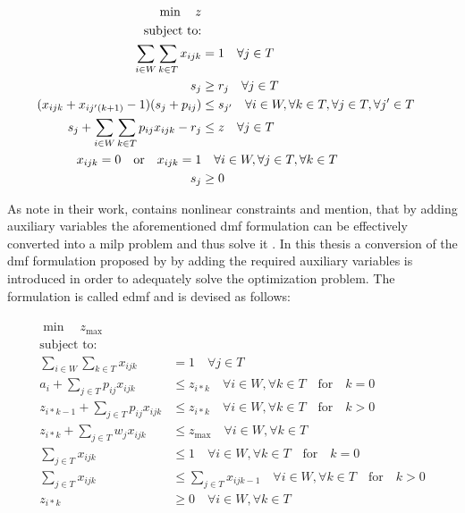 \begin{align}
    \min \quad z \notag \\
    \text{subject to:} \notag \\
    \sum_{i \in W} \sum_{k \in T} x_{ijk} &= 1 \quad \forall j \in T \notag \\
    s_j &\geq r_j \quad \forall j \in T \notag \\
    (x_{ijk} + x_{ij'(k+1)} - 1)(s_j + p_{ij}) &\leq s_{j'} \quad \forall i \in W, \forall k \in T, \forall j \in T, \forall j' \in T \label{eq:nonlinear_constraints_dmf}\\
    s_j + \sum_{i \in W} \sum_{k \in T} p_{ij} x_{ijk} - r_j &\leq z \quad \forall j \in T \notag \\
    x_{ijk} = 0 \quad \text{or} \quad x_{ijk} = 1 &\quad \forall i \in W, \forall j \in T, \forall k \in T \notag \\
    s_j &\geq 0 \notag 
\end{align}

As \citet{Zeng2005} note in their work,  contains nonlinear constraints and mention, that by adding auxiliary variables the aforementioned \gls{dmf} formulation can be effectively converted into a \gls{milp} problem and thus solve it \citep[p. 6]{Zeng2005}. In this thesis a conversion of the \gls{dmf} formulation proposed by \citet{Zeng2005} by adding the required auxiliary variables is introduced in order to adequately solve the optimization problem. The formulation is called \gls{edmf} and is devised as follows:

\begin{align}
	\begin{split}
	    \min \quad z_{\text{max}}\\
	    \text{subject to:} \\
	    \sum_{i \in W} \sum_{k \in T} x_{ijk} &= 1 \quad \forall j \in T\\
	    a_i + \sum_{j \in T} p_{ij} x_{ijk} &\leq z_{i*k} \quad \forall i \in W, \forall k \in T \quad \text{for} \quad k=0\\
	    z_{i*k-1} + \sum_{j \in T} p_{ij} x_{ijk} &\leq z_{i*k} \quad \forall i \in W, \forall k \in T \quad \text{for} \quad k>0\\
	    z_{i*k}+ \sum_{j \in T} w_j x_{ijk} &\leq z_{\text{max}} \quad \forall i \in W, \forall k \in T\\
	    \sum_{j \in T} x_{ijk} &\leq 1 \quad \forall i \in W, \forall k \in T \quad \text{for} \quad k=0\\
	    \sum_{j \in T} x_{ijk} &\leq \sum_{j \in T} x_{ijk-1} \quad \forall i \in W, \forall k \in T \quad \text{for} \quad k>0\\
	    z_{i*k} &\geq 0 \quad \forall i \in W, \forall k \in T
	\end{split}
\end{align}

